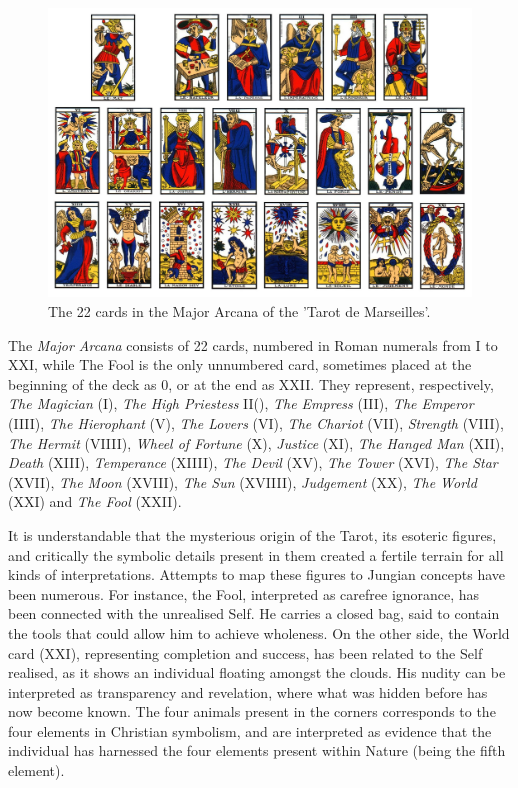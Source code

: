 \documentclass[
]{book}
\begin{document}
\begin{figure}

{\centering \includegraphics[width=\textwidth]{img/tarot} 

}

\caption{The 22 cards in the Major Arcana of the 'Tarot de Marseilles'.}\label{fig:unnamed-chunk-9}
\end{figure}

The \emph{Major Arcana} consists of 22 cards, numbered in Roman numerals from I to XXI, while The Fool is the only unnumbered card, sometimes placed at the beginning of the deck as 0, or at the end as XXII. They represent, respectively, \emph{The Magician} (I), \emph{The High Priestess} II(), \emph{The Empress} (III), \emph{The Emperor} (IIII), \emph{The Hierophant} (V), \emph{The Lovers} (VI), \emph{The Chariot} (VII), \emph{Strength} (VIII), \emph{The Hermit} (VIIII), \emph{Wheel of Fortune} (X), \emph{Justice} (XI), \emph{The Hanged Man} (XII), \emph{Death} (XIII), \emph{Temperance} (XIIII), \emph{The Devil} (XV), \emph{The Tower} (XVI), \emph{The Star} (XVII), \emph{The Moon} (XVIII), \emph{The Sun} (XVIIII), \emph{Judgement} (XX), \emph{The World} (XXI) and \emph{The Fool} (XXII).

It is understandable that the mysterious origin of the Tarot, its esoteric figures, and critically the symbolic details present in them created a fertile terrain for all kinds of interpretations. Attempts to map these figures to Jungian concepts have been numerous. For instance, the Fool, interpreted as carefree ignorance, has been connected with the unrealised Self. He carries a closed bag, said to contain the tools that could allow him to achieve wholeness. On the other side, the World card (XXI), representing completion and success, has been related to the Self realised, as it shows an individual floating amongst the clouds. His nudity can be interpreted as transparency and revelation, where what was hidden before has now become known. The four animals present in the corners corresponds to the four elements in Christian symbolism, and are interpreted as evidence that the individual has harnessed the four elements present within Nature (being the fifth element).
\end{document}

